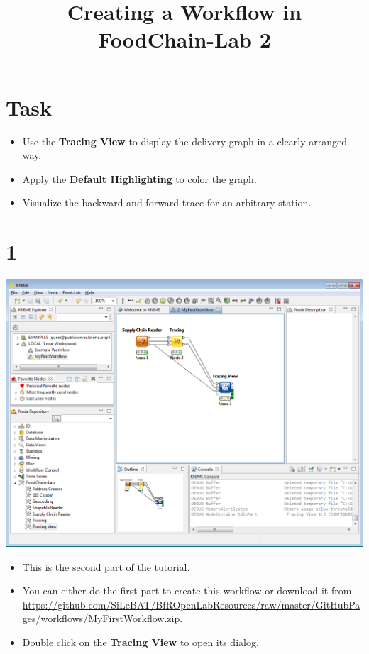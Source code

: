 \documentclass{beamer}
\title{Creating a Workflow in FoodChain-Lab 2}
\date{}
\begin{document}
\maketitle

\section{Task}
\begin{frame}
	\begin{itemize}
		\item Use the \textbf{Tracing View} to display the delivery graph in a clearly arranged way.
		\item Apply the \textbf{Default Highlighting} to color the graph.
		\item Visualize the backward and forward trace for an arbitrary station.
	\end{itemize}
\end{frame}
 
\section{1}
\begin{frame}
	\begin{center}
  		\includegraphics[height=0.6\textheight]{1.png}
	\end{center}
	\begin{itemize}
		\item This is the second part of the tutorial.
		\item You can either do the first part to create this workflow or download it from \url{https://github.com/SiLeBAT/BfROpenLabResources/raw/master/GitHubPages/workflows/MyFirstWorkflow.zip}.
		\item Double click on the \textbf{Tracing View} to open its dialog.
	\end{itemize}
\end{frame}
\end{document}

